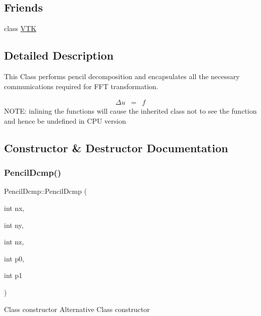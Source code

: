 \subsection*{Friends}
\begin{DoxyCompactItemize}
\item 
class \mbox{\hyperlink{classPencilDcmp_abf858174faa5fb6573824cbcbddf7924}{V\+TK}}
\end{DoxyCompactItemize}


\subsection{Detailed Description}
This Class performs pencil decomposition and encapsulates all the necessary communications required for F\+FT transformation. 

\begin{eqnarray*} \Delta u &=& f \end{eqnarray*} N\+O\+TE\+: inlining the functions will cause the inherited class not to see the function and hence be undefined in C\+PU version 

\subsection{Constructor \& Destructor Documentation}
\mbox{\label{classPencilDcmp_a0252169fc4c2d578ae7b5368e247d557}} 
\subsubsection{\texorpdfstring{Pencil\+Dcmp()}{PencilDcmp()}\hspace{0.1cm}{\footnotesize\ttfamily [1/2]}}
{\footnotesize\ttfamily Pencil\+Dcmp\+::\+Pencil\+Dcmp (\begin{DoxyParamCaption}\item[{int}]{nx,  }\item[{int}]{ny,  }\item[{int}]{nz,  }\item[{int}]{p0,  }\item[{int}]{p1 }\end{DoxyParamCaption})}

Class constructor Alternative Class constructor \mbox{\label{classPencilDcmp_aba2e52de6d05da361e99dfa078ea76ca}} 
